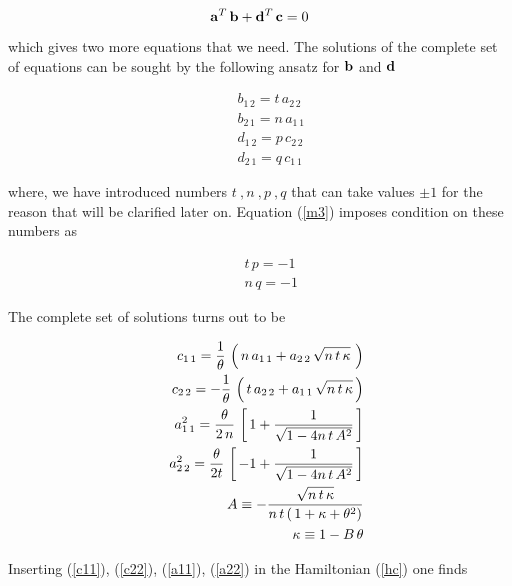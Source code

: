 \documentclass[a4paper,aps,prd,preprint]{revtex4}
\begin{document}
   \begin{equation}
   {\bf a}^T \, {\bf b} + {\bf d}^T\, {\bf c}=0\label{mixed}
   \end{equation}
   
   which gives  two more equations that we need. 
   The solutions of the complete set of equations can be sought by 
   the following ansatz for ${\bf b}$ and ${\bf d}$ 
   
   \begin{eqnarray}
   && b_{1\, 2}= t\, a_{2\,2}\label{b12}\\
   && b_{2\, 1}= n\, a_{1\,1}\label{b21}\\
   && d_{1\, 2}= p\, c_{2\,2}\label{d12}\\
   && d_{2\, 1}= q\, c_{1\,1}\label{d21}
   \end{eqnarray}
   
   where, we have introduced numbers $t\ , n\ ,p\ , q$  that can  take values 
   $\pm 1$ for the reason that will be clarified later on. 
   Equation (\ref{m3}) imposes condition on these numbers as
   
   \begin{eqnarray}
   && t\, p =-1\\
   && n\, q=-1
    \end{eqnarray}
    
    The complete set of solutions turns out to be 
    
   \begin{eqnarray}
   && c_{1\,1}= { 1 \over \theta}\,
   \left(\,n\, a_{1\,1} +a_{2\,2} \,\sqrt{ n\, t\, \kappa} \, \,\right)
   \label{c11}\\
   && c_{2\,2}= -{1\over \theta}\,
   \left(\, t\,  a_{2\,2} +a_{1\,1}\, \sqrt{ n\, t\,\kappa} \, \right)
   \label{c22}\\
   && a_{1\,1}^2= {\theta\over 2\,n}\,
   \left[\, 1+ {1\over\sqrt{1-4n\, t\,A^2}}\,\right]
   \label{a11}\\
   && a_{2\,2}^2= {\theta\over 2t}\,\left[\, -1+ {1\over\sqrt{1-4n\, t\,A^2}}\,
   \right]
   \label{a22}\\
   && A\equiv -{\sqrt{ n\,t\,\kappa}\over n\,t\, (\, 1+\kappa +\theta^2)}\\
   && \kappa \equiv 1 -B\,\theta
   \end{eqnarray}
    
    Inserting (\ref{c11}), (\ref{c22}), (\ref{a11}), (\ref{a22})
    in the Hamiltonian (\ref{hc}) one finds
    
\end{document}
